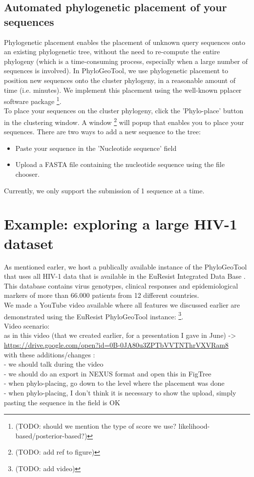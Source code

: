 \documentclass[a4paper, 11pt]{article} %
\begin{document}
\subsection{Automated phylogenetic placement of your sequences}
Phylogenetic placement enables the placement of unknown query sequences onto an existing phylogenetic tree, without the need to re-compute the entire phylogeny (which is a time-consuming process, especially when a large number of sequences is involved). In PhyloGeoTool, we use phylogenetic placement to position new sequences onto the cluster phylogeny, in a reasonable amount of time (i.e. minutes). We implement this placement using the well-known pplacer software package \cite{Matsen2010} \footnote{(TODO: should we mention the type of score we use? likelihood-based/posterior-based?)}.\\
To place your sequences on the cluster phylogeny, click the 'Phylo-place' button in the clustering window. A window \footnote{(TODO: add ref to figure)} will popup that enables you to place your sequences. There are two ways to add a new sequence to the tree:
\begin{itemize}
\item Paste your sequence in the 'Nucleotide sequence' field
\item Upload a FASTA file containing the nucleotide sequence using the file chooser.
\end{itemize}
Currently, we only support the submission of 1 sequence at a time.

\section{Example: exploring a large HIV-1 dataset}

As mentioned earler, we host a publically available instance of the PhyloGeoTool that uses all HIV-1 data that is available in the EuResist Integrated Data Base \cite{Zazzi2012}. 
This database contains virus genotypes, clinical responses and epidemiological markers of more than 66.000 patients from 12 different countries.\\
We made a YouTube video available where all features we discussed earlier are demonstrated using the EuResist PhyloGeoTool instance: \footnote{(TODO: add video)}. \\

Video scenario:\\
 as in this video (that we created earlier, for a presentation I gave in June) -> \url{https://drive.google.com/open?id=0B-0JA80u3ZPTbVVTNThrVXVRam8} \\
 with these additions/changes :\\  
 - we should talk during the video \\
 - we should do an export in NEXUS format and open this in FigTree \\
 - when phylo-placing, go down to the level where the placement was done\\
 - when phylo-placing, I don't think it is necessary to show the upload, simply pasting the sequence in the field is OK \\
\end{document}
